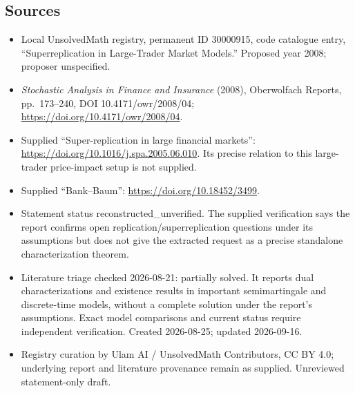 \documentclass[11pt]{article}
\begin{document}
\subsection{Sources}
\begin{itemize}
\item Local UnsolvedMath registry, permanent ID 30000915, code catalogue entry, ``Superreplication in Large-Trader Market Models.'' Proposed year 2008; proposer unspecified.
\item \emph{Stochastic Analysis in Finance and Insurance} (2008), Oberwolfach Reports, pp.\ 173--240, DOI 10.4171/owr/2008/04; \url{https://doi.org/10.4171/owr/2008/04}.
\item Supplied ``Super-replication in large financial markets'': \url{https://doi.org/10.1016/j.spa.2005.06.010}. Its precise relation to this large-trader price-impact setup is not supplied.
\item Supplied ``Bank--Baum'': \url{https://doi.org/10.18452/3499}.
\item Statement status reconstructed\_unverified. The supplied verification says the report confirms open replication/superreplication questions under its assumptions but does not give the extracted request as a precise standalone characterization theorem.
\item Literature triage checked 2026-08-21: partially solved. It reports dual characterizations and existence results in important semimartingale and discrete-time models, without a complete solution under the report's assumptions. Exact model comparisons and current status require independent verification. Created 2026-08-25; updated 2026-09-16.
\item Registry curation by Ulam AI / UnsolvedMath Contributors, CC BY 4.0; underlying report and literature provenance remain as supplied. Unreviewed statement-only draft.
\end{itemize}
\end{document}
